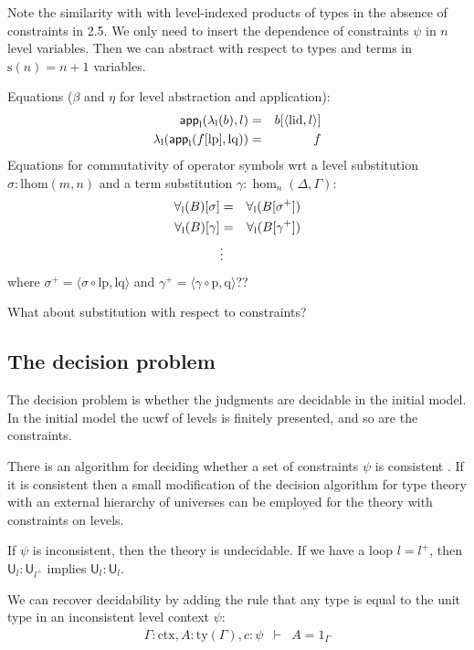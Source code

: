 \documentclass[11pt,a4paper]{article}
\theoremstyle{definition}
\newcommand{\UU}{\mathsf{U}}
\newcommand{\app}[2]{{#1\,#2}} %
\def\lhom{\mathrm{lhom}}
\def\UU{\mathsf{U}}
\def\lp{\mathrm{lp}}
\def\lq{\mathrm{lq}}
\def\s{\mathrm{s}}
\def\lid{\mathrm{lid}}
\newcommand{\ctx}{\mathrm{ctx}}
\newcommand{\ty}{\mathrm{ty}}
\newcommand{\tuple}[1]{\langle #1 \rangle}
\def\p{\mathrm{p}}
\def\q{\mathrm{q}}
\def\app{\mathsf{app}}
\begin{document}
Note the similarity with with level-indexed products of types in the absence of constraints in 2.5. We only need to insert the dependence of constraints $\psi$ in $n$ level variables. Then we can abstract with respect to types and terms in $\s(n) = n+1$ variables.
\begin{tiny}
Equations ($\beta$ and $\eta$ for level abstraction and application):
 \begin{eqnarray*}
 \app_\l(\lambda_\l(b),l) &=& b[\tuple{\lid,l}]\\
 \lambda_\l(\app_\l(f[\lp],\lq)) &=& f
 \end{eqnarray*}
 Equations for commutativity of operator symbols wrt a level substitution $\sigma : \lhom(m,n)$ and a term substitution $\gamma : \hom_n(\Delta,\Gamma)$:
 \begin{eqnarray*}
 \forall_{\mathrm{l}}(B)[ \sigma ] &=& \forall_{\mathrm{l}}(B[ \sigma^{+}])\\
 \forall_{\mathrm{l}}(B)[ \gamma ] &=& \forall_{\mathrm{l}}(B[ \gamma^+ ])\\
&\vdots&
\end{eqnarray*}
where $\sigma^+ = \tuple{\sigma \circ \lp, \lq}$ and $\gamma^+ = \tuple{\gamma \circ \p, \q}$??
\end{tiny}

What about substitution with respect to constraints?

\subsection{The decision problem}

The decision problem is whether the judgments are decidable in the initial model. In the initial model the ucwf of levels is finitely presented, and so are the constraints.

There is an algorithm for deciding whether a set of constraints $\psi$ is consistent \cite{bezem-coquand:lattices}. If it is consistent then a small modification of the decision algorithm for type theory with an external hierarchy of universes can be employed for the theory with constraints on levels.

If $\psi$ is inconsistent, then the theory is undecidable. If we have a loop $l = l^+$, then $\UU_l : \UU_{l^+}$ implies $\UU_l : \UU_l$.

We can recover decidability by adding the rule that any type is equal to the unit type in an inconsistent level context $\psi$:
\begin{eqnarray*}
 \Gamma : \ctx, A  : \ty(\Gamma), c : \psi &\vdash& A = 1_\Gamma
\end{eqnarray*}
\end{document}
